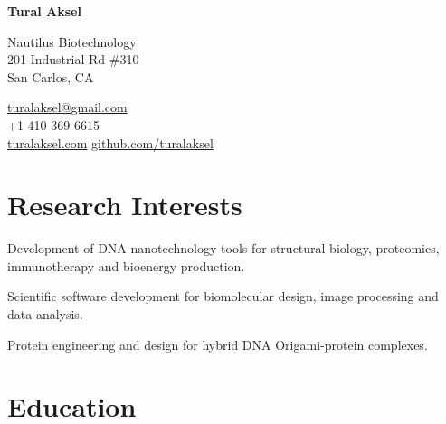 \documentclass[12pt,letterpaper]{report}
\newcommand{\myname}{Tural Aksel}
\newcommand{\namefont}[1]{{\normalfont\bfseries\Huge{#1}}}
\newcommand{\listitemspace}{0.25em}
\renewenvironment{itemize}
{\begin{list}{}{\setlength{\leftmargin}{0em}
                \setlength{\parskip}{0em}
                \setlength{\itemsep}{\listitemspace}
                \setlength{\parsep}{\listitemspace}}}
{\end{list}}
\begin{document}
    \raggedright{}

    \namefont{\myname}

    \vspace{1em}
    \begin{minipage}[t]{0.700\textwidth}
        Nautilus Biotechnology \\
        201 Industrial Rd \#310 \\
        San Carlos, CA \\
    \end{minipage}
    \begin{minipage}[t]{0.295\textwidth}
        \flushright{}
        \href{mailto:turalaksel@ngmail.com}{turalaksel@gmail.com} \\
        +1 410 369 6615 \\
        \href{https://www.linkedin.com/in/turalaksel}{turalaksel.com}
        \href{https://github.com/turalaksel}{github.com/turalaksel}
    \end{minipage}

    \section*{Research Interests}

    \begin{itemize}

        \item \textbullet \hspace{0.2cm} Development of DNA nanotechnology tools for structural biology, proteomics, immunotherapy and bioenergy production. 
        \item \textbullet \hspace{0.2cm} Scientific software development for biomolecular design, image processing and data analysis.
        \item \textbullet \hspace{0.2cm} Protein engineering and design for hybrid DNA Origami-protein complexes. 

    \end{itemize}

    \section*{Education}
\end{document}
